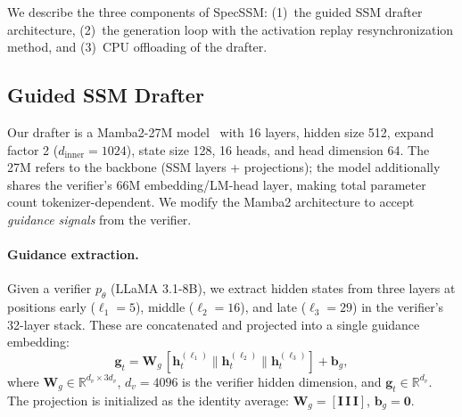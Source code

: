 We describe the three components of SpecSSM: (1)~the guided SSM drafter architecture, (2)~the generation loop with the activation replay resynchronization method, and (3)~CPU offloading of the drafter.

\subsection{Guided SSM Drafter}
\label{sec:guided}

Our drafter is a Mamba2-27M model~\citep{dao2024transformers} with 16 layers, hidden size 512, expand factor 2 ($d_{\mathrm{inner}}=1024$), state size 128, 16 heads, and head dimension 64.
The 27M refers to the backbone (SSM layers + projections); the model additionally shares the verifier's 66M embedding/LM-head layer, making total parameter count tokenizer-dependent.
We modify the Mamba2 architecture to accept \emph{guidance signals} from the verifier.

\paragraph{Guidance extraction.}
Given a verifier $p_\theta$ (LLaMA 3.1-8B), we extract hidden states from three layers at positions early ($\ell_1=5$), middle ($\ell_2=16$), and late ($\ell_3=29$) in the verifier's 32-layer stack.
These are concatenated and projected into a single guidance embedding:
\begin{equation}
  \mathbf{g}_t = \mathbf{W}_g\, [\mathbf{h}_t^{(\ell_1)} \| \mathbf{h}_t^{(\ell_2)} \| \mathbf{h}_t^{(\ell_3)}] + \mathbf{b}_g,
  \label{eq:guidance_extract}
\end{equation}
where $\mathbf{W}_g \in \mathbb{R}^{d_v \times 3d_v}$, $d_v = 4096$ is the verifier hidden dimension, and $\mathbf{g}_t \in \mathbb{R}^{d_v}$.
The projection is initialized as the identity average: $\mathbf{W}_g = [\mathbf{I}\, \mathbf{I}\, \mathbf{I}]$, $\mathbf{b}_g = \mathbf{0}$.

